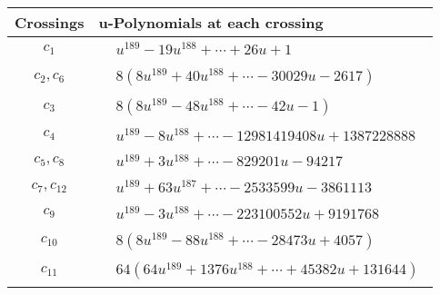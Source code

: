 \documentclass[1p]{elsarticle_modified}
\theoremstyle{definition}
\begin{document}
\begin{tabular}{m{50pt}|m{274pt}}
Crossings & \hspace{64pt}u-Polynomials at each crossing \\
\hline $$\begin{aligned}c_{1}\end{aligned}$$&$\begin{aligned}
&u^{189}-19 u^{188}+\cdots+26 u+1
\end{aligned}$\\
\hline $$\begin{aligned}c_{2},c_{6}\end{aligned}$$&$\begin{aligned}
&8(8 u^{189}+40 u^{188}+\cdots-30029 u-2617)
\end{aligned}$\\
\hline $$\begin{aligned}c_{3}\end{aligned}$$&$\begin{aligned}
&8(8 u^{189}-48 u^{188}+\cdots-42 u-1)
\end{aligned}$\\
\hline $$\begin{aligned}c_{4}\end{aligned}$$&$\begin{aligned}
&u^{189}-8 u^{188}+\cdots-12981419408 u+1387228888
\end{aligned}$\\
\hline $$\begin{aligned}c_{5},c_{8}\end{aligned}$$&$\begin{aligned}
&u^{189}+3 u^{188}+\cdots-829201 u-94217
\end{aligned}$\\
\hline $$\begin{aligned}c_{7},c_{12}\end{aligned}$$&$\begin{aligned}
&u^{189}+63 u^{187}+\cdots-2533599 u-3861113
\end{aligned}$\\
\hline $$\begin{aligned}c_{9}\end{aligned}$$&$\begin{aligned}
&u^{189}-3 u^{188}+\cdots-223100552 u+9191768
\end{aligned}$\\
\hline $$\begin{aligned}c_{10}\end{aligned}$$&$\begin{aligned}
&8(8 u^{189}-88 u^{188}+\cdots-28473 u+4057)
\end{aligned}$\\
\hline $$\begin{aligned}c_{11}\end{aligned}$$&$\begin{aligned}
&64(64 u^{189}+1376 u^{188}+\cdots+45382 u+131644)
\end{aligned}$\\
\hline
\end{tabular}\\~\\
\end{document}
